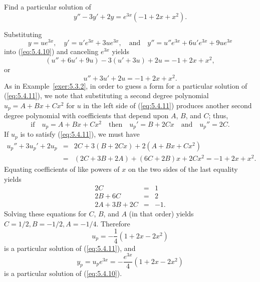 \documentclass{ximera}
\begin{document}
\begin{example}\label{example:5.4.4}
Find a particular solution of
\begin{equation} \label{eq:5.4.10}
y''-3y'+2y=e^{3x}(-1+2x+x^2).
\end{equation}
 
\begin{explanation}
Substituting
$$
y=ue^{3x},\quad y'=u'e^{3x}+3ue^{3x},\quad\mbox{and}\quad
y''=u''e^{3x}+6u'e^{3x}+9ue^{3x}
$$
into (\ref{eq:5.4.10}) and  canceling $e^{3x}$  yields
$$
(u''+6u'+9u)-3(u'+3u)+2u=-1+2x+x^2,
$$
or
\begin{equation} \label{eq:5.4.11}
u''+3u'+2u=-1+2x+x^2.
\end{equation}
As in Example~\ref{exer:5.3.2}, in order to guess a form for a particular
solution of
(\ref{eq:5.4.11}), we note that substituting a second degree polynomial
$u_p=A+Bx+Cx^2$ for $u$ in the left side of (\ref{eq:5.4.11}) produces
another second degree polynomial with coefficients that depend upon
$A$, $B$, and $C$;   thus,
$$
\mbox{if}\quad u_p=A+Bx+Cx^2\quad\mbox{then}\quad
u_p'=B+2Cx\quad\mbox{and}\quad u_p''=2C.
$$
If $u_p$ is to satisfy (\ref{eq:5.4.11}),  we must have
\begin{eqnarray*}
u_p''+3u_p'+2u_p&=&2C+3(B+2Cx)+2(A+Bx+Cx^2)\\
&=&(2C+3B+2A)+(6C+2B)x+2Cx^2=-1+2x+x^2.
\end{eqnarray*}
Equating  coefficients of like powers of $x$ on the two sides of the
last equality yields
$$
\begin{array}{rcr}
2C&=&1\\
2B+6C&=&2\\
2A+3B+2C&=& -1.
\end{array}
$$
Solving these equations for $C$, $B$, and $A$ (in that order) yields
 $C=1/2,B=-1/2,A=-1/4$.  Therefore
$$
u_p=-\frac{1}{4}(1+2x-2x^2)
$$
is a particular solution of  (\ref{eq:5.4.11}), and
$$
y_p=u_pe^{3x}=-\frac{e^{3x}}{4}(1+2x-2x^2)
$$
is a particular solution of  (\ref{eq:5.4.10}).
\end{explanation}
\end{example}
 
\end{document}
